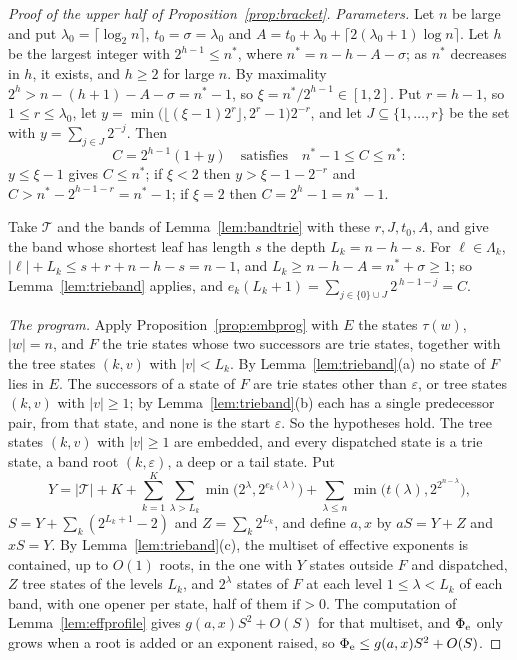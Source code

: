 \documentclass[11pt]{article}
\theoremstyle{remark}
\begin{document}
\begin{proof}[Proof of the upper half of Proposition~\ref{prop:bracket}]
\emph{Parameters.}  Let $n$ be large and put $\lambda_0=\lceil\log_2n\rceil$,
$t_0=\sigma=\lambda_0$ and $A=t_0+\lambda_0+\lceil2(\lambda_0+1)\log n\rceil$.  Let $h$
be the largest integer with $2^{h-1}\le n^*$, where $n^*=n-h-A-\sigma$; as $n^*$ decreases
in $h$, it exists, and $h\ge2$ for large $n$.  By maximality $2^h>n-(h+1)-A-\sigma=n^*-1$,
so $\xi=n^*/2^{h-1}\in[1,2]$.  Put $r=h-1$, so $1\le r\le\lambda_0$, let
$y=\min\bigl(\lfloor(\xi-1)2^r\rfloor,2^r-1\bigr)2^{-r}$, and let $J\subseteq\{1,\dots,r\}$
be the set with $y=\sum_{j\in J}2^{-j}$.  Then
\[
 C=2^{h-1}(1+y)\quad\text{satisfies}\quad n^*-1\le C\le n^* :
\]
$y\le \xi-1$ gives $C\le n^*$; if $\xi<2$ then $y>\xi-1-2^{-r}$ and $C>n^*-2^{h-1-r}=n^*-1$;
if $\xi=2$ then $C=2^h-1=n^*-1$.

Take $\mathcal T$ and the bands of Lemma~\ref{lem:bandtrie} with these $r,J,t_0,A$, and give
the band whose shortest leaf has length $s$ the depth $L_k=n-h-s$.  For
$\ell\in\Lambda_k$, $|\ell|+L_k\le s+r+n-h-s=n-1$, and $L_k\ge n-h-A=n^*+\sigma\ge1$; so
Lemma~\ref{lem:trieband} applies, and
$e_k(L_k+1)=\sum_{j\in\{0\}\cup J}2^{\,h-1-j}=C$.

\emph{The program.}  Apply Proposition~\ref{prop:embprog} with $E$ the states
$\tau(w)$, $|w|=n$, and $F$ the trie states whose two successors are trie states, together
with the tree states $(k,v)$ with $|v|<L_k$.  By Lemma~\ref{lem:trieband}(a) no state of
$F$ lies in $E$.  The successors of a state of $F$ are trie states other than
$\varepsilon$, or tree states $(k,v)$ with $|v|\ge1$; by Lemma~\ref{lem:trieband}(b) each
has a single predecessor pair, from that state, and none is the start $\varepsilon$.  So
the hypotheses hold.  The tree states $(k,v)$ with $|v|\ge1$ are embedded, and every
dispatched state is a trie state, a band root $(k,\varepsilon)$, a deep or a tail state.
Put
\[
 Y=|\mathcal T|+K+\sum_{k=1}^K\sum_{\lambda>L_k}\min\bigl(2^\lambda,2^{e_k(\lambda)}\bigr)
   +\sum_{\lambda\le n}\min\bigl(t(\lambda),2^{2^{n-\lambda}}\bigr),
\]
$S=Y+\sum_k(2^{L_k+1}-2)$ and $Z=\sum_k2^{L_k}$, and define $a,x$ by $aS=Y+Z$ and
$xS=Y$.  By Lemma~\ref{lem:trieband}(c), the multiset of effective exponents is contained,
up to $O(1)$ roots, in the one with $Y$ states outside $F$ and dispatched, $Z$ tree states
of the levels $L_k$, and $2^\lambda$ states of $F$ at each level $1\le\lambda<L_k$ of each
band, with one opener per state, half of them $\text{if}>0$.  The computation of
Lemma~\ref{lem:effprofile} gives $g(a,x)S^2+O(S)$ for that multiset, and $\Phi_{\rm e}$ only
grows when a root is added or an exponent raised, so $\Phi_{\rm e}\le g(a,x)S^2+O(S)$.


\end{proof}
\end{document}
